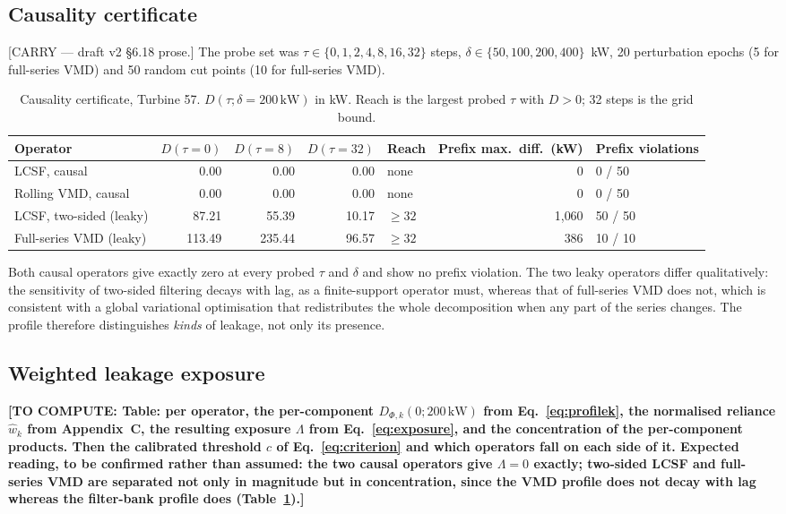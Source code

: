 \documentclass[review,3p,times]{elsarticle}
\newcommand{\todo}[1]{\textbf{[TO COMPUTE: #1]}}
\newcommand{\carry}[1]{\textsf{\small [CARRY --- #1]}}
\begin{document}
\subsection{Causality certificate}\label{sec:certres}
\carry{draft v2 §6.18 prose.} The probe set was
$\tau\in\{0,1,2,4,8,16,32\}$ steps, $\delta\in\{50,100,200,400\}$~kW,
20 perturbation epochs (5 for full-series VMD) and 50 random cut points
(10 for full-series VMD).

\begin{table}[htbp]\centering
\caption{Causality certificate, Turbine 57. $D(\tau;\delta=200\,\mathrm{kW})$
in kW. Reach is the largest probed $\tau$ with $D>0$; 32 steps is the grid
bound.}
\label{tab:cert}
\footnotesize
\begin{tabular}{lrrrlrl}
\toprule
Operator & $D(\tau{=}0)$ & $D(\tau{=}8)$ & $D(\tau{=}32)$ & Reach &
Prefix max.\ diff.\ (kW) & Prefix violations \\
\midrule
LCSF, causal              &   0.00 &   0.00 &  0.00 & none      & 0 & 0 / 50 \\
Rolling VMD, causal       &   0.00 &   0.00 &  0.00 & none      & 0 & 0 / 50 \\
LCSF, two-sided (leaky)   &  87.21 &  55.39 & 10.17 & $\ge32$   & 1{,}060 & 50 / 50 \\
Full-series VMD (leaky)   & 113.49 & 235.44 & 96.57 & $\ge32$   & 386 & 10 / 10 \\
\bottomrule
\end{tabular}
\end{table}

Both causal operators give exactly zero at every probed $\tau$ and $\delta$ and
show no prefix violation. The two leaky operators differ qualitatively: the
sensitivity of two-sided filtering decays with lag, as a finite-support
operator must, whereas that of full-series VMD does not, which is consistent
with a global variational optimisation that redistributes the whole
decomposition when any part of the series changes. The profile therefore
distinguishes \emph{kinds} of leakage, not only its presence.

\subsection{Weighted leakage exposure}\label{sec:exposureres}
\todo{Table: per operator, the per-component $D_{\Phi,k}(0;200\,\mathrm{kW})$
from Eq.~\eqref{eq:profilek}, the normalised reliance $\hat w_k$ from
Appendix~C, the resulting exposure $\Lambda$ from Eq.~\eqref{eq:exposure}, and
the concentration of the per-component products. Then the calibrated threshold
$c$ of Eq.~\eqref{eq:criterion} and which operators fall on each side of it.
Expected reading, to be confirmed rather than assumed: the two causal operators
give $\Lambda=0$ exactly; two-sided LCSF and full-series VMD are separated not
only in magnitude but in concentration, since the VMD profile does not decay
with lag whereas the filter-bank profile does
(Table~\ref{tab:cert}).}
\end{document}
